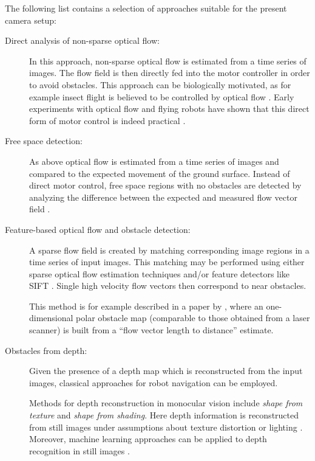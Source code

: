 The following list contains a selection of approaches suitable for the present camera setup:
\begin{description}
 \item[Direct analysis of non-sparse optical flow:] In this approach, non-sparse optical flow is estimated from a time series of images. The flow field is then directly fed into the motor controller in order to avoid obstacles. This approach can be biologically motivated, as for example insect flight is believed to be controlled by optical flow \citep{Egelhaaf:2009}. Early experiments with optical flow and flying robots have shown that this direct form of motor control is indeed practical \citep{doi:10.1117/12.131575}.

 \item[Free space detection:] As above optical flow is estimated from a time series of images and compared to the expected movement of the ground surface. Instead of direct motor control, free space regions with no obstacles are detected by analyzing the difference between the expected and measured flow vector field \citep{yoshizaki:inria-00325322}.

 \item[Feature-based optical flow and obstacle detection:] A sparse flow field is created by matching corresponding image regions in a time series of input images. This matching may be performed using either sparse optical flow estimation techniques and/or feature detectors like SIFT \citep{Lowe04distinctiveimage}. Single high velocity flow vectors then correspond to near obstacles.

 This method is for example described in a paper by \citet{Low05obstacledetection}, where an one-dimensional polar obstacle map (comparable to those obtained from a laser scanner) is built from a ``flow vector length to distance'' estimate.

 \item[Obstacles from depth:] Given the presence of a depth map which is reconstructed from the input images, classical approaches for robot navigation \citep[][chapters 5 and 6]{AutonomousMobileRobots} can be employed.

 Methods for depth reconstruction in monocular vision include \textit{shape from texture} and \textit{shape from shading}. Here depth information is reconstructed from still images under assumptions about texture distortion or lighting \citep{buelthoff1991shape}. Moreover, machine learning approaches can be applied to depth recognition in still images \citep{depthStill}.


\end{description}
